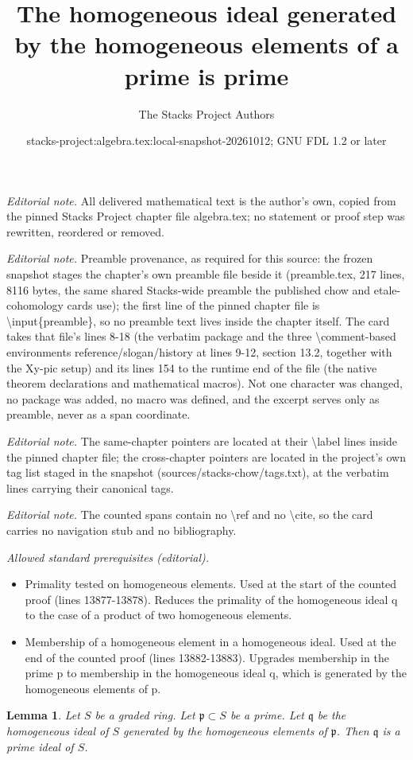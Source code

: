 \documentclass[10pt,a4paper]{amsart}
\title{The homogeneous ideal generated by the homogeneous elements of a prime is prime}
\author{The Stacks Project Authors}
\date{stacks-project:algebra.tex:local-snapshot-20261012; GNU FDL 1.2 or later}
\theoremstyle{plain}
\newtheorem{lemma}[subsection]{Lemma}
\theoremstyle{definition}
\theoremstyle{remark}
\numberwithin{equation}{subsection}
\begin{document}
\maketitle
\noindent\textit{Editorial note.} All delivered mathematical text is the author's own, copied from the pinned Stacks Project chapter file algebra.tex; no statement or proof step was rewritten, reordered or removed.\par\medskip
\noindent\textit{Editorial note.} Preamble provenance, as required for this source: the frozen snapshot stages the chapter's own preamble file beside it (preamble.tex, 217 lines, 8116 bytes, the same shared Stacks-wide preamble the published chow and etale-cohomology cards use); the first line of the pinned chapter file is \textbackslash{}input\{preamble\}, so no preamble text lives inside the chapter itself. The card takes that file's lines 8-18 (the verbatim package and the three \textbackslash{}comment-based environments reference/slogan/history at lines 9-12, section 13.2, together with the Xy-pic setup) and its lines 154 to the runtime end of the file (the native theorem declarations and mathematical macros). Not one character was changed, no package was added, no macro was defined, and the excerpt serves only as preamble, never as a span coordinate.\par\medskip
\noindent\textit{Editorial note.} The same-chapter pointers are located at their \textbackslash{}label lines inside the pinned chapter file; the cross-chapter pointers are located in the project's own tag list staged in the snapshot (sources/stacks-chow/tags.txt), at the verbatim lines carrying their canonical tags.\par\medskip
\noindent\textit{Editorial note.} The counted spans contain no \textbackslash{}ref and no \textbackslash{}cite, so the card carries no navigation stub and no bibliography.\par\medskip
\noindent\textit{Allowed standard prerequisites (editorial).}\begin{itemize}
\item Primality tested on homogeneous elements. Used at the start of the counted proof (lines 13877-13878). Reduces the primality of the homogeneous ideal q to the case of a product of two homogeneous elements.
\item Membership of a homogeneous element in a homogeneous ideal. Used at the end of the counted proof (lines 13882-13883). Upgrades membership in the prime p to membership in the homogeneous ideal q, which is generated by the homogeneous elements of p.
\end{itemize}\medskip
\begin{lemma}
\label{lemma-smear-out}
Let $S$ be a graded ring.
Let $\mathfrak p \subset S$ be a prime.
Let $\mathfrak q$ be the homogeneous ideal of $S$ generated by the
homogeneous elements of $\mathfrak p$. Then $\mathfrak q$ is a
prime ideal of $S$.
\end{lemma}
\end{document}
